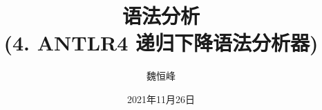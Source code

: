 \documentclass[]{beamer}
\title[语法分析]{语法分析 \\ (4. ANTLR4 递归下降语法分析器)}
\author[魏恒峰]{\large 魏恒峰}
\institute{hfwei@nju.edu.cn}
\date{2021年11月26日}
\begin{document}
\maketitle





\thankyou{}

\end{document}
